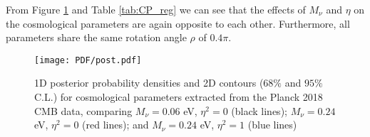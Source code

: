 From Figure \ref{fig:post} and Table \ref{tab:CP_reg} we can see that the effects of $M_\nu$ and $\eta$ on the cosmological parameters are again opposite to each other. Furthermore, all parameters share the same rotation angle $\rho$ of $0.4\pi$.

\begin{figure}[!h]
		\begin{center}%
		\texttt{[image: PDF/post.pdf]}
		\caption{\label{fig:post}1D posterior probability densities and 2D contours ($68\%$ and $95\%$ C.L.) for cosmological parameters extracted from the Planck 2018 CMB data, comparing $M_\nu = 0.06$ eV,  $\eta^2 = 0$ (black lines); $M_\nu = 0.24$ eV,  $\eta^2 = 0$ (red lines); and $M_\nu = 0.24$ eV,  $\eta^2 = 1$ (blue lines)} 
		\end{center}
\end{figure}




